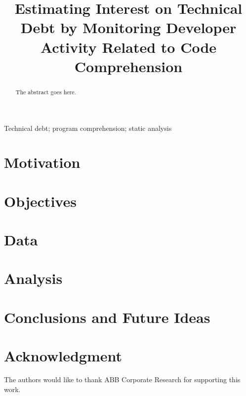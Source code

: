 \documentclass[conference]{IEEEtran}
\begin{document}
\title{Estimating Interest on Technical Debt by Monitoring Developer Activity Related to Code Comprehension}

\author{
\and
{}
}

\maketitle

\begin{abstract}
The abstract goes here.
\end{abstract}

\begin{IEEEkeywords}
Technical debt; program comprehension; static analysis
\end{IEEEkeywords}

\section{Motivation}


\section{Objectives}


\section{Data}


\section{Analysis}
%

\section{Conclusions and Future Ideas}


\section*{Acknowledgment}
The authors would like to thank ABB Corporate Research for supporting this work.



\end{document}
